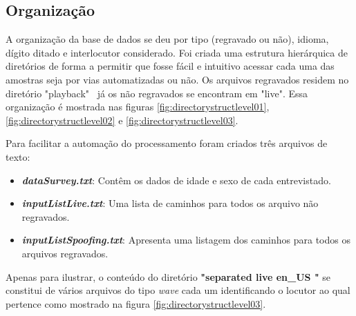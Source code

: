 \begin{myenv}{1.5}
			\subsection{Organização}
				\par A organização da base de dados se deu por tipo (regravado ou não), idioma, dígito ditado e interlocutor considerado. Foi criada uma estrutura hierárquica de diretórios de forma a permitir que fosse fácil e intuitivo acessar cada uma das amostras seja por vias automatizadas ou não. Os arquivos regravados residem no diretório "playback" \ já os não regravados se encontram em "live".	Essa organização é mostrada nas figuras \ref{fig:directorystructlevel01}, \ref{fig:directorystructlevel02} e \ref{fig:directorystructlevel03}.
				
				\par Para facilitar a automação do processamento foram criados três arquivos de texto:
				\begin{itemize}
					\item \textit{\textbf{dataSurvey.txt}}: Contêm os dados de idade e sexo de cada entrevistado.
					\item \textit{\textbf{inputListLive.txt}}: Uma lista de caminhos para todos os arquivo não regravados.
					\item \textit{\textbf{inputListSpoofing.txt}}: Apresenta uma listagem dos caminhos para todos os arquivos regravados.
				\end{itemize}
			
				\par Apenas para ilustrar, o conteúdo do diretório \textbf{"separated \textfractionsolidus live \textfractionsolidus en\_US "} se constitui de vários arquivos do tipo \textit{wave} cada um identificando o locutor ao qual pertence como mostrado na  figura \ref{fig:directorystructlevel03}.
					

\end{myenv}
